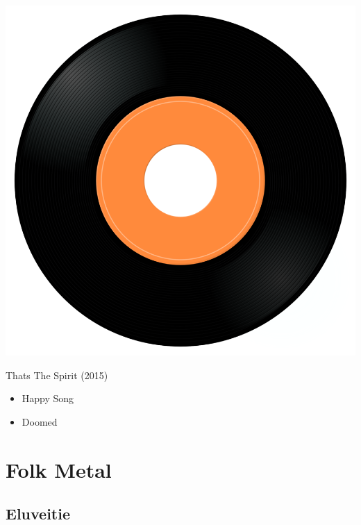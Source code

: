 \begin{minipage}[t]{0.25\textwidth}
\captionsetup{type=figure}
\includegraphics[width=\textwidth]{Images/cover.png}
\caption*{Thats The Spirit (2015)}
\end{minipage}
\begin{minipage}[t]{0.25\textwidth}\vspace{0pt}
\begin{itemize}[nosep,leftmargin=1em,labelwidth=*,align=left]
	\setlength{\itemsep}{0pt}
	\item Happy Song
	\item Doomed
\end{itemize}
\end{minipage}


\section{Folk Metal}

\subsection{Eluveitie}

